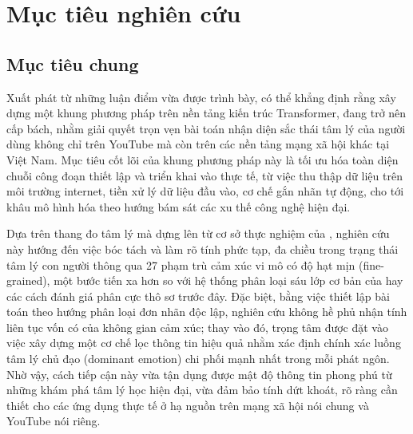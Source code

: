 \section{Mục tiêu nghiên cứu}

\subsection{Mục tiêu chung}
Xuất phát từ những luận điểm vừa được trình bày, có thể khẳng định rằng xây dựng một khung phương pháp trên nền tảng kiến trúc Transformer, đang trở nên cấp bách, nhằm giải quyết trọn vẹn bài toán nhận diện sắc thái tâm lý của người dùng không chỉ trên YouTube mà còn trên các nền tảng mạng xã hội khác tại Việt Nam. Mục tiêu cốt lõi của khung phương pháp này là tối ưu hóa toàn diện chuỗi công đoạn thiết lập và triển khai vào thực tế, từ việc thu thập dữ liệu trên môi trường internet, tiền xử lý dữ liệu đầu vào, cơ chế gắn nhãn tự động, cho tới khâu mô hình hóa theo hướng bám sát các xu thế công nghệ hiện đại.

Dựa trên thang đo tâm lý mà \textcite{demszky2020goemotions} dựng lên từ cơ sở thực nghiệm của \textcite{cowen2019primacy}, nghiên cứu này hướng đến việc bóc tách và làm rõ tính phức tạp, đa chiều trong trạng thái tâm lý con người thông qua 27 phạm trù cảm xúc vi mô có độ hạt mịn (fine-grained), một bước tiến xa hơn so với hệ thống phân loại sáu lớp cơ bản của \textcite{ekman1992there} hay các cách đánh giá phân cực thô sơ trước đây. Đặc biệt, bằng việc thiết lập bài toán theo hướng phân loại đơn nhãn độc lập, nghiên cứu không hề phủ nhận tính liên tục vốn có của không gian cảm xúc; thay vào đó, trọng tâm được đặt vào việc xây dựng một cơ chế lọc thông tin hiệu quả nhằm xác định chính xác luồng tâm lý chủ đạo (dominant emotion) chi phối mạnh nhất trong mỗi phát ngôn. Nhờ vậy, cách tiếp cận này vừa tận dụng được mật độ thông tin phong phú từ những khám phá tâm lý học hiện đại, vừa đảm bảo tính dứt khoát, rõ ràng cần thiết cho các ứng dụng thực tế ở hạ nguồn trên mạng xã hội nói chung và YouTube nói riêng.

